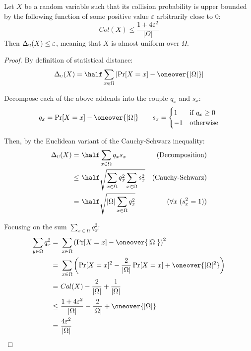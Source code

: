 \begin{lemma} \label{lem:colbound}
    Let $X$ be a random variable such that its collision probability is upper bounded by the following function of some positive value $\varepsilon$ arbitrarily close to $0$:
    \[
        Col(X) \leq \frac{1 + 4\varepsilon^2}{|\Omega|}
    \]
    Then $\Delta_\textsc{u}(X) \leq \varepsilon$, meaning that $X$ is almost uniform over $\Omega$.
\end{lemma}


\begin{proof}
    By definition of statistical distance:
    \[
        \sdtu(X) = \half \sum_{x \in \Omega} \left| \Pr[X = x] - \oneover{|\Omega|} \right|
    \]

    Decompose each of the above addends into the couple $q_x$ and $s_x$:
    \[
        q_x = \Pr[X = x] - \oneover{|\Omega|} \qquad s_x =
        \begin{cases}
            1  & \text{if $q_x \geq 0$} \\
            -1 & \text{otherwise}
        \end{cases}
    \]
    
    Then, by the Euclidean variant of the Cauchy-Schwarz inequality:
    \begin{align*}
        \sdtu(X) =&\ \half \sum_{x \in \Omega} q_x s_x                                & \text{(Decomposition)}     \\
              \leq&\ \half \sqrt{\sum_{x \in \Omega} q_x^2 \sum_{x \in \Omega} s_x^2} & \text{(Cauchy-Schwarz)}    \\
                 =&\ \half \sqrt{|\Omega| \sum_{x \in \Omega} q_x^2}                  & (\forall x \; (s_x^2 = 1)) \\
    \end{align*}

    Focusing on the sum $\sum_{x \in \Omega} q_x^2$:
    \begin{align*}
        \sum_{y \in \Omega} q_x^2 =&\ \sum_{x \in \Omega} \left( \Pr[X = x] - \oneover{|\Omega|} \right)^2                                   \\
                                  =&\ \sum_{x \in \Omega} \left( \Pr[X = x]^2 - \frac{2}{|\Omega|} \Pr[X = x] + \oneover{|\Omega|^2} \right) \\
                                  =&\ Col(X) - \frac{2}{|\Omega|} + \frac{1}{|\Omega|}                                                       \\
                               \leq&\ \frac{1 + 4 \varepsilon^2}{|\Omega|} - \frac{2}{|\Omega|} + \oneover{|\Omega|}                         \\
                                  =&\ \frac{4 \varepsilon^2}{|\Omega|}
    \end{align*}


\end{proof}
